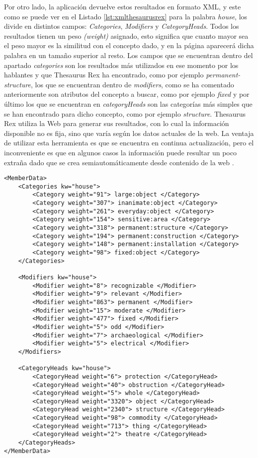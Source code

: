 Por otro lado, la aplicación devuelve estos resultados en formato XML, y este como se puede ver en el Listado \ref{lst:xmlthesaurusrex} para la palabra \textit{house}, los divide en distintos campos: \textit{Categories}, \textit{Modifiers} y \textit{CategoryHeads}. Todos los resultados tienen un peso \textit{(weight)} asignado, esto significa que cuanto mayor sea el peso mayor es la similitud con el concepto dado, y en la página aparecerá dicha palabra en un tamaño superior al resto. 
Los campos que se encuentran dentro del apartado \textit{categories} son los resultados más utilizados en ese momento por los hablantes y que Thesaurus Rex ha encontrado, como por ejemplo \textit{permanent-structure}, los que se encuentran dentro de  \textit{modifiers}, como se ha comentado anteriormente son atributos del concepto a buscar, como por ejemplo \textit{fixed}  y por último los que se encuentran en \textit{categoryHeads} son las categorías más simples que se han encontrado para dicho concepto, como por ejemplo \textit{structure}.
Thesaurus Rex utiliza la Web para generar sus resultados, con lo cual la información disponible no es fija, sino que varía según los datos actuales de la web.
La ventaja de utilizar esta herramienta es que se encuentra en continua actualización, pero el inconveniente es que en algunos casos la información puede resultar un poco extraña dado que se crea semiautomáticamente desde contenido de la web \citep{VealeT2013}.

\lstset{language=XML}
\begin{lstlisting}[caption= Ejemplo formatos XML Thesaurus Rex para la palabra \textit{house}, label={lst:xmlthesaurusrex}, frame=single]
<MemberData>
	<Categories kw="house">
		<Category weight="91"> large:object </Category>
		<Category weight="307"> inanimate:object </Category>
		<Category weight="261"> everyday:object </Category>
		<Category weight="154"> sensitive:area </Category>
		<Category weight="318"> permanent:structure </Category>
		<Category weight="194"> permanent:construction </Category>
		<Category weight="148"> permanent:installation </Category>
		<Category weight="98"> fixed:object </Category>
	</Categories>
	
	<Modifiers kw="house">
		<Modifier weight="8"> recognizable </Modifier>
		<Modifier weight="9"> relevant </Modifier>
		<Modifier weight="863"> permanent </Modifier>
		<Modifier weight="15"> moderate </Modifier>
		<Modifier weight="477"> fixed </Modifier>
		<Modifier weight="5"> odd </Modifier>
		<Modifier weight="7"> archaeological </Modifier>
		<Modifier weight="5"> electrical </Modifier>
	</Modifiers>
	
	<CategoryHeads kw="house">
		<CategoryHead weight="6"> protection </CategoryHead>
		<CategoryHead weight="40"> obstruction </CategoryHead>
		<CategoryHead weight="5"> whole </CategoryHead>
		<CategoryHead weight="3320"> object </CategoryHead>
		<CategoryHead weight="2340"> structure </CategoryHead>
		<CategoryHead weight="98"> commodity </CategoryHead>
		<CategoryHead weight="713"> thing </CategoryHead>
		<CategoryHead weight="2"> theatre </CategoryHead>
	</CategoryHeads>
</MemberData>

\end{lstlisting}

